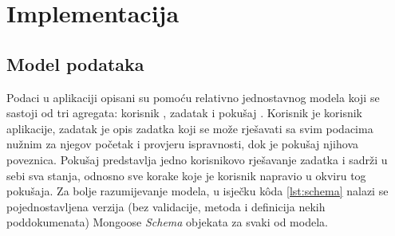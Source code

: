 \documentclass[times, utf8, diplomski, numeric]{fer}
\begin{document}















\chapter{Implementacija}


\section{Model podataka} \label{sec:data}

Podaci u aplikaciji opisani su pomoću relativno jednostavnog modela koji se sastoji od tri agregata: korisnik , zadatak  i pokušaj .
Korisnik je korisnik aplikacije, zadatak je opis zadatka koji se može rješavati sa svim podacima nužnim za njegov početak i provjeru ispravnosti, dok je pokušaj njihova poveznica.
Pokušaj predstavlja jedno korisnikovo rješavanje zadatka i sadrži u sebi sva stanja, odnosno sve korake koje je korisnik napravio u okviru tog pokušaja.
Za bolje razumijevanje modela, u isječku kôda \ref{lst:schema} nalazi se pojednostavljena verzija (bez validacije, metoda i definicija nekih poddokumenata) Mongoose \emph{Schema} objekata za svaki od modela.
\end{document}
